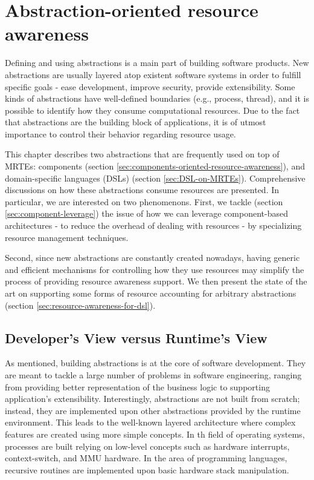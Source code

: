 \chapter{Abstraction-oriented resource awareness}
\label{chap:abstractions_and_resource_management}


Defining and using abstractions is a main part of building software products.
New abstractions are usually layered atop existent software systems in order to fulfill specific goals
- ease development, improve security, provide extensibility.
Some kinds of abstractions have well-defined boundaries (e.g., process, thread), and it is possible to identify how they consume computational resources.
Due to the fact that abstractions are the building block of applications, it is of utmost importance to control their behavior regarding resource usage.
  
This chapter describes two abstractions that are frequently used on top of MRTEs: components (section \ref{sec:components-oriented-resource-awareness}), and domain-specific languages (DSLs) (section \ref{sec:DSL-on-MRTEs}).
Comprehensive discussions on how these abstractions consume resources are presented.
In particular, we are interested on two phenomenons.
First, we tackle (section \ref{sec:component-leverage}) the issue of how we can leverage component-based architectures - to reduce the overhead of dealing with resources - by specializing resource management techniques.

Second, since new abstractions are constantly created nowadays, having generic and efficient mechanisms for controlling how they use resources may simplify the process of providing resource awareness support.
We then present the state of the art on supporting some forms of resource accounting for arbitrary abstractions (section \ref{sec:resource-awareness-for-dsl}).

\section{Developer's View versus Runtime's View} \label{sec:chapter2-introduction}

As mentioned, building abstractions is at the core of software development.
They are meant to tackle a large number of problems in software engineering, ranging from providing better representation of the business logic to supporting application's extensibility.
Interestingly, abstractions are not built from scratch; instead, they are implemented upon other abstractions provided by the runtime environment.
This leads to the well-known layered architecture where complex features are created using more simple concepts.
In th field of operating systems, processes are built relying on low-level concepts such as hardware interrupts, context-switch, and MMU hardware.
In the area of programming languages, recursive routines are implemented upon basic hardware stack manipulation.


